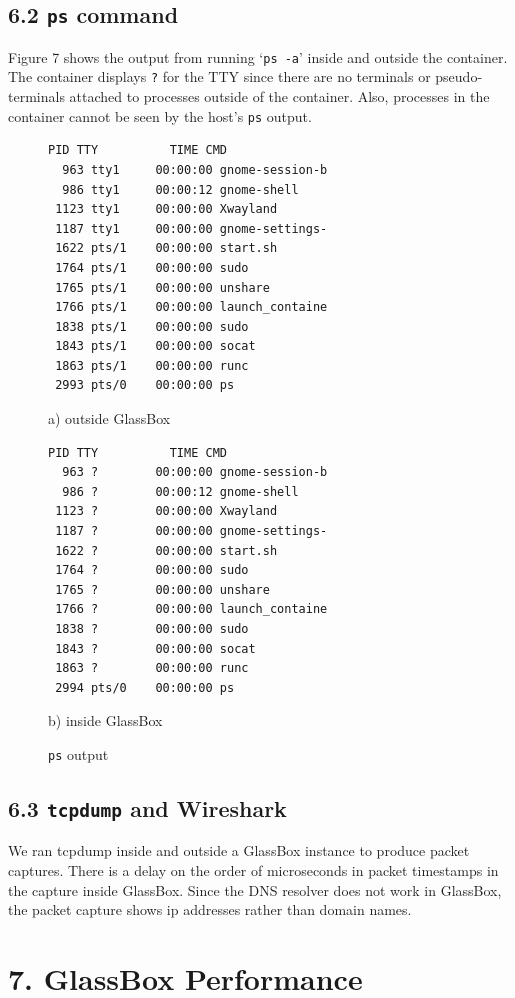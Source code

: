 \documentclass{proc}
\begin{document}
\subsection*{6.2 \texttt{ps} command}
Figure 7 shows the output from running `\texttt{ps -a}' inside and outside the container. The container displays \texttt{?} for the TTY since there are no terminals or pseudo-terminals attached to processes outside of the container. Also, processes in the container cannot be seen by the host's \texttt{ps} output.
 \begin{figure}[h]
\begin{lstlisting}[linewidth=\linewidth]
  PID TTY          TIME CMD
  963 tty1     00:00:00 gnome-session-b
  986 tty1     00:00:12 gnome-shell
 1123 tty1     00:00:00 Xwayland
 1187 tty1     00:00:00 gnome-settings-
 1622 pts/1    00:00:00 start.sh
 1764 pts/1    00:00:00 sudo
 1765 pts/1    00:00:00 unshare
 1766 pts/1    00:00:00 launch_containe
 1838 pts/1    00:00:00 sudo
 1843 pts/1    00:00:00 socat
 1863 pts/1    00:00:00 runc
 2993 pts/0    00:00:00 ps
 \end{lstlisting}
\hspace{7.5em} a) outside GlassBox
 \begin{lstlisting}[linewidth=\linewidth]
  PID TTY          TIME CMD
  963 ?        00:00:00 gnome-session-b
  986 ?        00:00:12 gnome-shell
 1123 ?        00:00:00 Xwayland
 1187 ?        00:00:00 gnome-settings-
 1622 ?        00:00:00 start.sh
 1764 ?        00:00:00 sudo
 1765 ?        00:00:00 unshare
 1766 ?        00:00:00 launch_containe
 1838 ?        00:00:00 sudo
 1843 ?        00:00:00 socat
 1863 ?        00:00:00 runc
 2994 pts/0    00:00:00 ps
\end{lstlisting}
\hspace{7.5em} b) inside GlassBox
 \caption{\texttt{ps} output}
\end{figure}

\subsection*{6.3 \texttt{tcpdump} and Wireshark}
We ran tcpdump inside and outside a GlassBox instance to produce packet captures. There is a delay on the order of microseconds in packet timestamps in the capture inside GlassBox. Since the DNS resolver does not work in GlassBox, the packet capture shows ip addresses rather than domain names.

\section*{7. GlassBox Performance}
\end{document}
